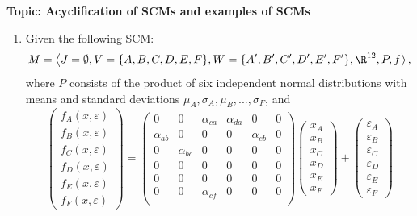 
\flushleft\textbf{Topic: Acyclification of SCMs and examples of SCMs}

\begin{enumerate}
	\item %
	Given the following SCM:
	$$M = \left\langle J=\emptyset, V=\{A, B, C, D, E, F\}, W=\{A', B', C', D', E', F'\}, \R^{12}, P, f \right\rangle,$$
	where $P$ consists of the product of six independent normal distributions with means and standard deviations $\mu_A, \sigma_A, \mu_B, ..., \sigma_F$, and
	\[
		\begin{pmatrix}
			f_A(x, \varepsilon) \\ f_B(x, \varepsilon) \\ f_C(x, \varepsilon) \\ f_D(x, \varepsilon) \\ f_E(x, \varepsilon) \\ f_F(x, \varepsilon)
		\end{pmatrix}
		=
		\begin{pmatrix}
			0           & 0           & \alpha_{ca} & \alpha_{da} & 0           & 0 \\
			\alpha_{ab} & 0           & 0           & 0           & \alpha_{eb} & 0 \\
			0           & \alpha_{bc} & 0           & 0           & 0           & 0 \\
			0           & 0           & 0           & 0           & 0           & 0 \\
			0           & 0           & 0           & 0           & 0           & 0 \\
			0           & 0           & \alpha_{cf} & 0           & 0           & 0 \\
		\end{pmatrix}
		\begin{pmatrix}
			x_A \\ x_B \\ x_C \\ x_D \\ x_E \\ x_F
		\end{pmatrix}
		+
		\begin{pmatrix}
			\varepsilon_A \\ \varepsilon_B \\ \varepsilon_C \\ \varepsilon_D \\ \varepsilon_E \\ \varepsilon_F

\end{pmatrix}\]
\end{enumerate}
